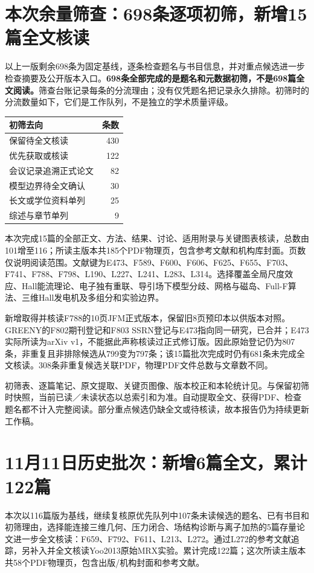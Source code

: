 \section{本次余量筛查：698条逐项初筛，新增15篇全文核读}
以上一版剩余698条为固定基线，逐条检查题名与书目信息，并对重点候选进一步检查摘要及公开版本入口。\textbf{698条全部完成的是题名和元数据初筛，不是698篇全文阅读。}筛查台账记录每条的分流理由；没有仅凭题名把记录永久排除。初筛时的分流数量如下，它们是工作队列，不是独立的学术质量评级。
\begin{center}\small
\begin{tabular}{lr}\toprule 初筛去向 & 条数\\\midrule
保留待全文核读 &430\\
优先获取或核读 &122\\
会议记录追溯正式论文 &82\\
模型边界待全文确认 &30\\
长文或学位资料单列 &25\\
综述与章节单列 &9\\\bottomrule
\end{tabular}
\end{center}
本次完成15篇的全部正文、方法、结果、讨论、适用附录与关键图表核读，总数由101增至116；所读主版本共185个PDF物理页，包含参考文献和机构库封面。页数仅说明阅读范围。文献键为E473、F589、F600、F606、F625、F655、F703、F741、F788、F798、L190、L227、L241、L283、L314。选择覆盖全局尺度效应、Hall能流理论、电子独有重联、导引场下模型分歧、网格与磁岛、Full-F算法、三维Hall发电机及多组分和实验边界。

新增取得并核读F788的10页JFM正式版本，保留旧8页预印本以供版本对照。GREENY的F802期刊登记和F803 SSRN登记与E473指向同一研究，已合并；E473实际所读为arXiv v1，不能据此声称核读过正式修订版。因此原始登记仍为807条，非重复且非排除候选从799变为797条；该15篇批次完成时仍有681条未完成全文核读。308条非重复候选关联PDF，物理PDF文件总数与文章数不同。

初筛表、逐篇笔记、原文提取、关键页图像、版本校正和本轮统计见。与保留初筛时快照，当前已读／未读状态以总索引和为准。自动提取全文、获得PDF、检查题名都不计入完整阅读。部分重点候选仍缺全文或待核读，故本报告仍为持续更新工作稿。

\section{11月11日历史批次：新增6篇全文，累计122篇}
本次以116篇版为基线，继续复核原优先队列中107条未读候选的题名、已有书目和初筛理由，选择能连接三维几何、压力闭合、场结构诊断与离子加热的5篇存量论文进一步全文核读：F659、F792、F611、L213、L272。通过L272的参考文献追踪，另补入并全文核读Yoo2013原始MRX实验。累计完成122篇；这次所读主版本共58个PDF物理页，包含出版/机构封面和参考文献。


